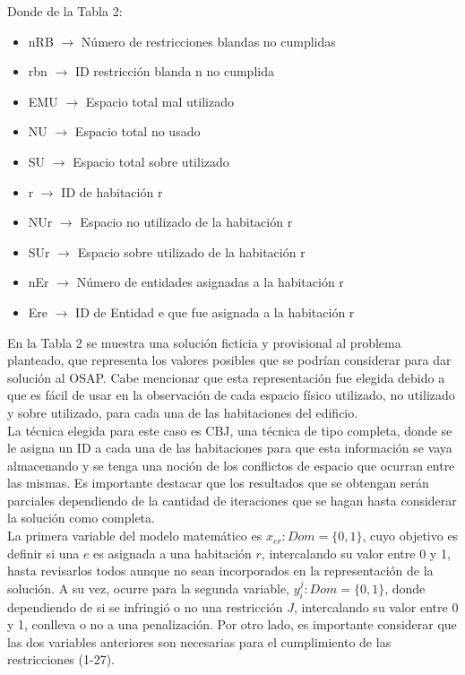 \documentclass[letter, 10pt]{article}
\begin{document}
\noindent
Donde de la Tabla 2:
\begin{itemize}[noitemsep]
    \item nRB $\rightarrow$ N\'umero de restricciones blandas no cumplidas 
    \item rbn $\rightarrow$ ID restricci\'on blanda n no cumplida 
    \item EMU $\rightarrow$ Espacio total mal utilizado 
    \item NU $\rightarrow$ Espacio total no usado 
    \item SU $\rightarrow$ Espacio total sobre utilizado 
    \item r $\rightarrow$ ID de habitaci\'on r 
    \item NUr $\rightarrow$ Espacio no utilizado de la habitaci\'on r
    \item SUr $\rightarrow$ Espacio sobre utilizado de la habitaci\'on r 
    \item nEr $\rightarrow$ N\'umero de entidades asignadas a la habitaci\'on r 
    \item Ere $\rightarrow$ ID de Entidad e que fue asignada a la habitaci\'on r
\end{itemize}
\noindent
En la Tabla 2 se muestra una soluci\'on ficticia y provisional al problema planteado, que representa los valores posibles que se podr\'ian considerar para dar soluci\'on al OSAP. Cabe mencionar que esta representaci\'on fue elegida debido a que es f\'acil de usar en la observaci\'on de cada espacio f\'isico utilizado, no utilizado y sobre utilizado, para cada una de las habitaciones del edificio. \\ 
\noindent
La t\'ecnica elegida para este caso es CBJ, una t\'ecnica de tipo completa, donde se le asigna un ID a cada una de las habitaciones para que esta informaci\'on se vaya almacenando y se tenga una noci\'on de los conflictos de espacio que ocurran entre las mismas. Es importante destacar que los resultados que se obtengan ser\'an parciales dependiendo de la cantidad de iteraciones que se hagan hasta considerar la soluci\'on como completa.\\
\noindent
La primera variable del modelo matem\'atico es $x_{er}: Dom = \{ 0, 1 \}$, cuyo objetivo es definir si una $e$ es asignada a una habitaci\'on $r$, intercalando su valor entre 0 y 1, hasta revisarlos todos aunque no sean incorporados en la representaci\'on de la soluci\'on. 
A su vez, ocurre para la segunda variable, $y_i^j: Dom = \{ 0, 1 \}$, donde dependiendo de si se infringi\'o o no una restricci\'on $J$, intercalando su valor entre 0 y 1, conlleva o no a una penalizaci\'on. Por otro lado, es importante considerar que las dos variables anteriores son necesarias para el cumplimiento de las restricciones (1-27).
\end{document}
